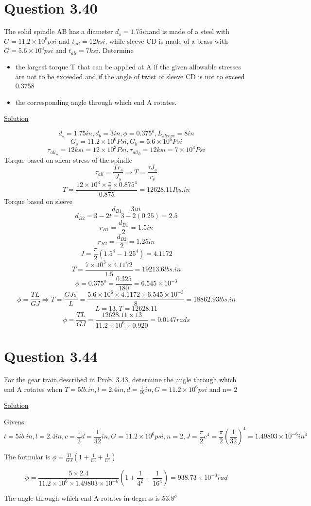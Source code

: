 \documentclass{article}
\begin{document}
\section*{Question 3.40}
The solid spindle AB has a diameter $d_{s}=1.75 in $and is made of a steel with$ G =11.2 \times 10^{6}psi$ and $t_{all}= 12 ksi$, while sleeve CD is made of a brass with $G = 5.6 \times 10^{6}psi$ and $t_{all} = 7 ksi$. Determine 
\begin{itemize}
\item  the largest torque T that can be applied at A if the given allowable stresses are not to be exceeded and if the angle of twist of sleeve CD is not to exceed 0.3758
\item the corresponding angle through which end A rotates.
\end{itemize}
\begin{center}\underline{Solution}\end{center}
\[d_{s} = 1.75in, d_{b} = 3in, \phi = 0.375^{o},L_{sleeve} = 8in\]
\[G_{s} = 11.2\times10^{6}Psi, G_{b} = 5.6\times10^{6}Psi\]
\[ {{\tau_{all}}_{s}}=12ksi = 12\times10^{3}Psi,  {{\tau_{all}}_{b}}=12ksi = 7\times10^{3}Psi\]
Torque based on shear stress of the spindle
\[\tau_{all} = \frac{Tr_{s}}{J_{s}} \Rightarrow T = \frac{\tau J_{s}}{r_{s}}\]
\[T = \frac{12\times10^{3}\times\frac{\pi}{2}\times{0.875}^{4}}{0.875} = 12628.11Ibs.in\]
Torque based on sleeve 
\[d_{B1} = 3in\]
\[d_{B2} = 3-2t = 3-2(0.25) = 2.5\]
\[r_{B1} = \frac{d_{B1}}{2} = 1.5in\]
\[r_{B2} = \frac{d_{B2}}{2} =1.25in\]
\[J = \frac{\pi}{2}(1.5^{4} - 1.25^{4}) = 4.1172\]
\[T = \frac{7\times10^{3}\times4.1172}{1.5} = 19213.6lbs.in\]
\[\phi = 0.375^{o} = \frac{0.325}{180} = 6.545\times10^{-3}\]
\[\phi = \frac{TL}{GJ} \Rightarrow T= \frac{GJ\phi}{L} = \frac{5.6\times10^{6}\times4.1172\times6.545\times10^{-3}}{8} = 18862.93lbs.in\]
\[L = 13, T = 12628.11\]
\[\phi = \frac{TL}{GJ} = \frac{12628.11\times13}{11.2\times10^{6}\times0.920} = 0.0147rads\]





\section*{Question 3.44}
 For the gear train described in Prob. 3.43, determine the angle through which end A rotates when $T = 5 lb. in, l= 2.4 in, d = \frac{1}{16}in, G = 11.2\times10^{6} psi$ and n= 2
\begin{center}\underline{Solution}\end{center}
Givens: \[t = 5ib.in, l=2.4in, c=\frac{1}{2}d = \frac{1}{32}in, G = 11.2\times10^{6}psi, n = 2, J = \frac{\pi}{2}c^{4} =  \frac{\pi}{2}{(\frac{1}{32})}^{4} = 1.49803\times10^{-6}in^{4}\]
\begin{center}The formular is $\phi = \frac{Tl}{GJ}(1 + \frac{1}{n^{2}}+  \frac{1}{n^{4}})$\end{center}
\[\phi = \frac{5\times2.4}{11.2\times10^{6}\times1.49803\times10^{-6}}(1 + \frac{1}{4^{2}}+  \frac{1}{16^{4}}) = 938.73\times10^{-3}rad\]
\begin{center} The angle through which end A rotates in degress is $53.8^{o}$\end{center}
\end{document}
